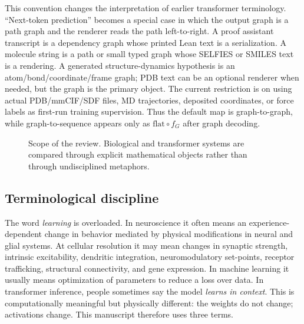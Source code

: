 \documentclass[11pt]{article}
\newcommand{\1}{\mathbf{1}}
\begin{document}
This convention changes the interpretation of earlier transformer terminology. ``Next-token prediction'' becomes a special case in which the output graph is a path graph and the renderer reads the path left-to-right. A proof assistant transcript is a dependency graph whose printed Lean text is a serialization. A molecule string is a path or small typed graph whose SELFIES or SMILES text is a rendering. A generated structure-dynamics hypothesis is an atom/bond/coordinate/frame graph; PDB text can be an optional renderer when needed, but the graph is the primary object. The current restriction is on using actual PDB/mmCIF/SDF files, MD trajectories, deposited coordinates, or force labels as first-run training supervision. Thus the default map is graph-to-graph, while graph-to-sequence appears only as \(\mathrm{flat}\circ f_G\) after graph decoding.


\begin{figure}[H]
\centering
{}
\caption{Scope of the review. Biological and transformer systems are compared through explicit mathematical objects rather than through undisciplined metaphors.}
\label{fig:scope}
\end{figure}

\subsection{Terminological discipline}

The word \emph{learning} is overloaded. In neuroscience it often means an experience-dependent change in behavior mediated by physical modifications in neural and glial systems. At cellular resolution it may mean changes in synaptic strength, intrinsic excitability, dendritic integration, neuromodulatory set-points, receptor trafficking, structural connectivity, and gene expression. In machine learning it usually means optimization of parameters to reduce a loss over data. In transformer inference, people sometimes say the model \emph{learns in context}. This is computationally meaningful but physically different: the weights do not change; activations change. This manuscript therefore uses three terms.
\end{document}
